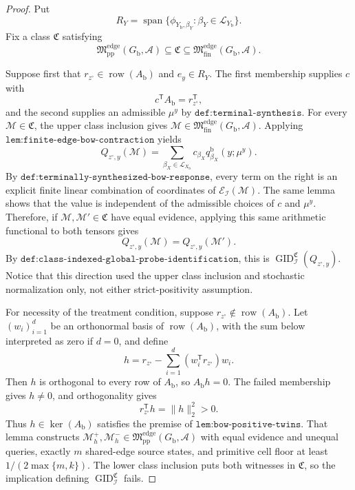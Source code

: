\documentclass{article}
\begin{document}
\begin{proof}
Put
\[
R_Y=\operatorname{span}\{\phi_{Y_{\mathrm b},\beta_Y}:\beta_Y\in\mathcal L_{Y_{\mathrm b}}\}.
\]
Fix a class \(\mathfrak C\) satisfying
\[
\mathfrak M_{\mathrm{pp}}^{\mathrm{edge}}(G_{\mathrm b},\mathcal A)
\subseteq\mathfrak C
\subseteq\mathfrak M_{\mathrm{fin}}^{\mathrm{edge}}(G_{\mathrm b},\mathcal A).
\]

Suppose first that \(r_{z^{\circ}}\in\operatorname{row}(A_{\mathrm b})\) and \(e_y\in R_Y\).  The first membership supplies \(c\) with
\[
c^{\mathsf T}A_{\mathrm b}=r_{z^{\circ}}^{\mathsf T},
\]
and the second supplies an admissible \(\mu^y\) by \(\texttt{def:terminal-synthesis}\).  For every \(\mathcal M\in\mathfrak C\), the upper class inclusion gives \(\mathcal M\in\mathfrak M_{\mathrm{fin}}^{\mathrm{edge}}(G_{\mathrm b},\mathcal A)\).  Applying \(\texttt{lem:finite-edge-bow-contraction}\) yields
\[
Q_{z^{\circ},y}(\mathcal M)
=\sum_{\beta_X\in\mathcal L_{X_{\mathrm b}}}
c_{\beta_X}q^{\mathrm b}_{\beta_X}(y;\mu^y).
\]
By \(\texttt{def:terminally-synthesized-bow-response}\), every term on the right is an explicit finite linear combination of coordinates of \(\mathcal E_{\mathcal I}(\mathcal M)\).  The same lemma shows that the value is independent of the admissible choices of \(c\) and \(\mu^y\).  Therefore, if \(\mathcal M,\mathcal M'\in\mathfrak C\) have equal evidence, applying this same arithmetic functional to both tensors gives
\[
Q_{z^{\circ},y}(\mathcal M)=Q_{z^{\circ},y}(\mathcal M').
\]
By \(\texttt{def:class-indexed-global-probe-identification}\), this is \(\operatorname{GID}_{\mathcal I}^{\mathfrak C}(Q_{z^{\circ},y})\).  Notice that this direction used the upper class inclusion and stochastic normalization only, not either strict-positivity assumption.

For necessity of the treatment condition, suppose \(r_{z^{\circ}}\notin\operatorname{row}(A_{\mathrm b})\).  Let \((w_i)_{i=1}^d\) be an orthonormal basis of \(\operatorname{row}(A_{\mathrm b})\), with the sum below interpreted as zero if \(d=0\), and define
\[
h=r_{z^{\circ}}-\sum_{i=1}^d(w_i^{\mathsf T}r_{z^{\circ}})w_i.
\]
Then \(h\) is orthogonal to every row of \(A_{\mathrm b}\), so \(A_{\mathrm b}h=0\).  The failed membership gives \(h\neq0\), and orthogonality gives
\[
r_{z^{\circ}}^{\mathsf T}h=\lVert h\rVert_2^2>0.
\]
Thus \(h\in\ker(A_{\mathrm b})\) satisfies the premise of \(\texttt{lem:bow-positive-twins}\).  That lemma constructs \(\mathcal M_h^+,\mathcal M_h^-\in\mathfrak M_{\mathrm{pp}}^{\mathrm{edge}}(G_{\mathrm b},\mathcal A)\) with equal evidence and unequal queries, exactly \(m\) shared-edge source states, and primitive cell floor at least \(1/(2\max\{m,k\})\).  The lower class inclusion puts both witnesses in \(\mathfrak C\), so the implication defining \(\operatorname{GID}_{\mathcal I}^{\mathfrak C}\) fails.


\end{proof}
\end{document}
